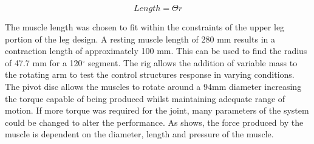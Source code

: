 \documentclass[11pt,a4paper]{article}
\begin{document}
\begin{equation}
    Length = \Theta r
    \label{math:arc_length}
\end{equation}

The muscle length was chosen to fit within the constraints of the upper leg portion of the leg design. A resting muscle length of 280 mm results in a contraction length of approximately 100 mm. This can be used to find the radius of 47.7 mm for a 120$^{\circ}$ segment. 
The rig allows the addition of variable mass to the rotating arm to test the control structures response in varying conditions. The pivot disc allows the muscles to rotate around a 94mm diameter increasing the torque capable of being produced whilst maintaining adequate range of motion.
If more torque was required for the joint, many parameters of the system could be changed to alter the performance. As  shows, the force produced by the muscle is dependent on the diameter, length and pressure of the muscle.
\end{document}
